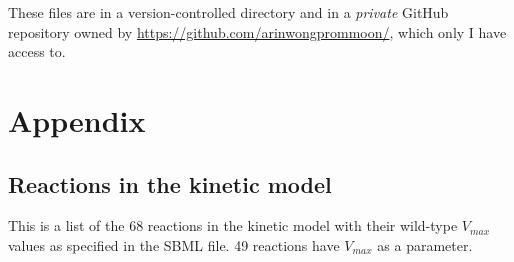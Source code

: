 \documentclass[parskip=full, numbers=noenddot]{scrreprt}
\begin{document}
These files are in a version-controlled directory and in a \emph{private} GitHub repository owned by \url{https://github.com/arinwongprommoon/}, which only I have access to.

\appendix
\chapter*{Appendix}
\renewcommand{\thesection}{\Alph{section}}

\section{Reactions in the kinetic model}
\label{ap:kineticreactionlist}

This is a list of the 68 reactions in the kinetic model with their wild-type $V_{max}$ values as specified in the SBML file. 49 reactions have $V_{max}$ as a parameter.
\end{document}
